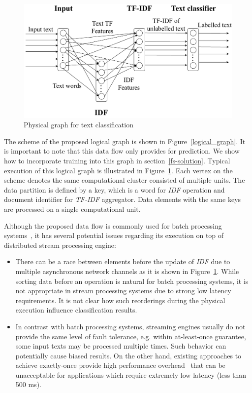 \begin{figure}[htbp]
  \centering
  \includegraphics[scale=0.30]{pics/physical-graph-no-part-fit}
  \caption{Physical graph for text classification}
  \label {physical_graph}
\end{figure}

The scheme of the proposed logical graph is shown in Figure~\ref{logical_graph}. It is important to note that this data flow only provides for prediction. 
We show how to incorporate training into this graph in section~\ref{fs-solution}.
Typical execution of this logical graph is illustrated in Figure~\ref{physical_graph}. Each vertex on the scheme denotes the same computational cluster consisted of multiple units. The data partition is defined by a key, which is a word for {\em IDF} operation and document identifier for {\em TF-IDF} aggregator. Data elements with the same keys are processed on a single computational unit.

Although the proposed data flow is commonly used for batch processing systems~\cite{semberecki2016distributed}, it has several potential issues regarding its execution on top of distributed stream processing engine:

\begin{itemize}
    \item There can be a race between elements before the update of {\em IDF} due to multiple asynchronous network channels as it is shown in Figure~\ref{physical_graph}. 
     While sorting data before an operation is natural for batch processing systems, it is not appropriate in stream processing systems due to strong low latency requirements. It is not clear how such reorderings during the physical execution influence classification results.
    \item In contrast with batch processing systems, streaming engines usually do not provide the same level of fault tolerance, e.g. within at-least-once guarantee, some input texts may be processed multiple times. Such behavior can potentially cause biased results. On the other hand, existing approaches to achieve exactly-once provide high performance overhead~\cite{we2018beyondmr} that can be unacceptable for applications which require extremely low latency (less than 500 ms).
\end{itemize}